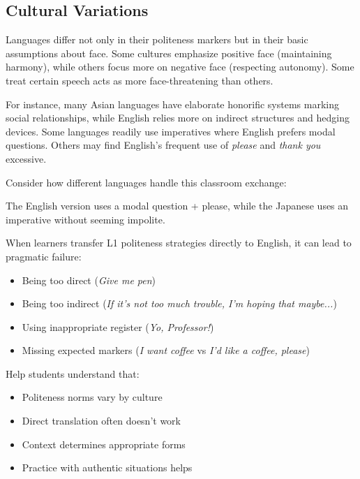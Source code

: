 \subsection{Cultural Variations}

Languages differ not only in their politeness markers but in their basic assumptions about face. Some cultures emphasize positive face (maintaining harmony), while others focus more on negative face (respecting autonomy). Some treat certain speech acts as more face-threatening than others.

For instance, many Asian languages have elaborate honorific systems marking social relationships, while English relies more on indirect structures and hedging devices. Some languages readily use imperatives where English prefers modal questions. Others may find English's frequent use of \textit{please} and \textit{thank you} excessive.

Consider how different languages handle this classroom exchange:
\ea \label{ex:class-exchange}
    \z
\z

The English version uses a modal question + please, while the Japanese uses an imperative without seeming impolite.

\begin{tcolorbox}[title=Cross-cultural Pragmatic Failure, colback=white]
When learners transfer L1 politeness strategies directly to English, it can lead to pragmatic failure:
\begin{itemize}
    \item Being too direct (\textit{Give me pen})
    \item Being too indirect (\textit{If it's not too much trouble, I'm hoping that maybe...})
    \item Using inappropriate register (\textit{Yo, Professor!})
    \item Missing expected markers (\textit{I want coffee} vs \textit{I'd like a coffee, please})
\end{itemize}

Help students understand that:
\begin{itemize}
    \item Politeness norms vary by culture
    \item Direct translation often doesn't work
    \item Context determines appropriate forms
    \item Practice with authentic situations helps
\end{itemize}
\end{tcolorbox}


